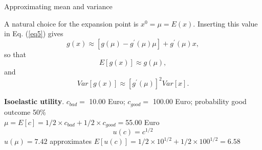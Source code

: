 \documentclass[11pt,table]{beamer}
\begin{document}
%
%
%
%
%
%
%
%
%
%
%
%

\begin{frame}{Approximating mean and variance}

A natural choice for the expansion point is $x^{0} = \mu = E(x)$. Inserting this value in Eq. (\ref{eq5}) gives
\begin{equation}\label{eq6}
    g(x)\approx [g(\mu)-g^{\prime}(\mu)\mu]+g^{\prime}(\mu)x,
\end{equation}
so that
\begin{equation}\label{eq7}
    E[g(x)] \approx g(\mu),
\end{equation}
and
\begin{equation}\label{eq8}
    Var[g(x)]\approx [g^{\prime}(\mu)]^{2} Var[x].
\end{equation}
\scriptsize
\begin{example} \textbf{Isoelastic utility}.
$c_{bad}=$	10.00 Euro; $c_{good}=$	100.00 Euro;  probability good outcome	50\%\\[2ex]
$\mu=E[c]=1/2 \times c_{bad}+ 1/2 \times c_{good}=$55.00 Euro\\
$$u(c)= c^{1/2}$$
$u(\mu)= 7.42$ approximates $E[u(c)]= 1/2\times10^{1/2}+1/2\times100^{1/2}=6.58$
\end{example}

\end{frame}
\end{document}
